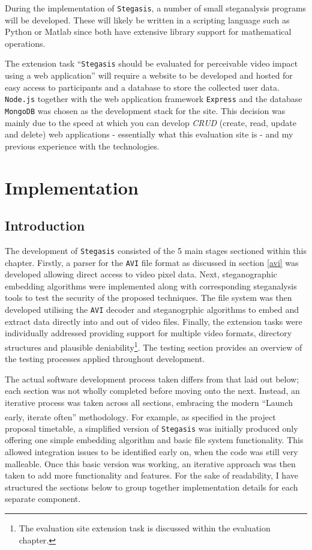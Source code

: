 \documentclass[paper=a4, fontsize=11pt,twoside]{scrartcl}
\numberwithin{table}{section}
\numberwithin{figure}{section}
\numberwithin{algorithm}{section}
\begin{document}
During the implementation of \texttt{Stegasis}, a number of small steganalysis programs will be developed. These will likely be written in a scripting language such as Python or Matlab since both have extensive library support for mathematical operations.

The extension task ``\texttt{Stegasis} should be evaluated for perceivable video impact using a web application'' will require a website to be developed and hosted for easy access to participants and a database to store the collected user data. \texttt{Node.js} together with the web application framework \texttt{Express} and the database \texttt{MongoDB} was chosen as the development stack for the site. This decision was mainly due to the speed at which you can develop \textit{CRUD} (create, read, update and delete) web applications - essentially what this evaluation site is - and my previous experience with the technologies.


\section{Implementation}

\subsection{Introduction}

The development of \texttt{Stegasis} consisted of the 5 main stages sectioned within this chapter. Firstly, a parser for the \texttt{AVI} file format as discussed in section \ref{avi} was developed allowing direct access to video pixel data. Next, steganographic embedding algorithms were implemented along with corresponding steganalysis tools to test the security of the proposed techniques. The file system was then developed utilising the \texttt{AVI} decoder and steganogrphic algorithms to embed and extract data directly into and out of video files. Finally, the extension tasks were individually addressed providing support for multiple video formats, directory structures and plausible deniability\footnote{The evaluation site extension task is discussed within the evaluation chapter.}. The testing section provides an overview of the testing processes applied throughout development. 

The actual software development process taken differs from that laid out below; each section was not wholly completed before moving onto the next. Instead, an iterative process was taken across all sections, embracing the modern ``Launch early, iterate often'' methodology\textsuperscript{\cite{iterate}}. For example, as specified in the project proposal timetable, a simplified version of \texttt{Stegasis} was initially produced only offering one simple embedding algorithm and basic file system functionality. This allowed integration issues to be identified early on, when the code was still very malleable. Once this basic version was working, an iterative approach was then taken to add more functionality and features. For the sake of readability, I have structured the sections below to group together implementation details for each separate component.
\end{document}
